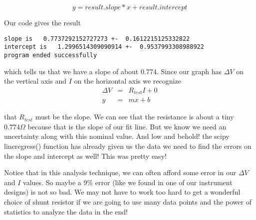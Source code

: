\begin{equation*}
	y = result.slope*x + result.intercept
\end{equation*}

\noindent Our code gives the result

\begin {verbatim}
slope is   0.7737292152727273 +-  0.1612215125332822
intercept is   1.2996514309090914 +-  0.9537993308988922
program ended successfully
\end{verbatim}

\noindent which tells us that we have a slope of about $0.774.$ Since our graph
has $\Delta V$ on the vertical axis and $I$ on the horizontal axis we
recognize 
\begin{eqnarray*}
	\Delta V &=&R_{test}I+0 \\
           y &=&mx+b
\end{eqnarray*}

that $R_{test}$ must be the slope. We can see that the resistance is about a tiny $0.774\unit{\Omega}$ because that is the slope of our fit line. But we know we need an uncertainty along with this nominal value. And low and behold! the scipy lineregress() function has already given us the data we need to find the errors on the slope and intercept as well! This was pretty easy!

Notice that in this analysis technique, we can often afford some error in our 
$\Delta V$ and $I$ values. So maybe a $9\%$ error (like we found in one of
our instrument designs) is not so bad. We may not have to work too hard to
get a wonderful choice of shunt resistor if we are going to use many data
points and the power of statistics to analyze the data in the end!
